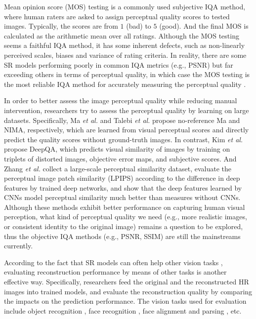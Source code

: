 \label{sec_iqa_mos}
Mean opinion score (MOS) testing is a commonly used subjective IQA method, where human raters are asked to assign perceptual quality scores to tested images.
Typically, the scores are from $1$ (bad) to $5$ (good).
And the final MOS is calculated as the arithmetic mean over all ratings.
Although the MOS testing seems a faithful IQA method, it has some inherent defects, such as non-linearly perceived scales, biases and variance of rating criteria.
In reality, there are some SR models performing poorly in common IQA metrics (e.g., PSNR) but far exceeding others in terms of perceptual quality, in which case the MOS testing is the most reliable IQA method for accurately measuring the perceptual quality .

\label{sec_iqa_learning_perceptual}
In order to better assess the image perceptual quality while reducing manual intervention, researchers try to assess the perceptual quality by learning on large datasets.
Specifically, Ma \textit{et al.}  and Talebi \textit{et al.}  propose no-reference Ma and NIMA, respectively, which are learned from visual perceptual scores and directly predict the quality scores without ground-truth images.
In contrast, Kim \textit{et al.}  propose DeepQA, which predicts visual similarity of images by training on triplets of distorted images, objective error maps, and subjective scores.
And Zhang \textit{et al.}  collect a large-scale perceptual similarity dataset, evaluate the perceptual image patch similarity (LPIPS) according to the difference in deep features by trained deep networks, and show that the deep features learned by CNNs model perceptual similarity much better than measures without CNNs.
Although these methods exhibit better performance on capturing human visual perception, what kind of perceptual quality we need (e.g., more realistic images, or consistent identity to the original image) remains a question to be explored, thus the objective IQA methods (e.g., PSNR, SSIM) are still the mainstreams currently.

\label{sec_iqa_task}
According to the fact that SR models can often help other vision tasks , evaluating reconstruction performance by means of other tasks is another effective way.  
Specifically, researchers feed the original and the reconstructed HR images into trained models, and evaluate the reconstruction quality by comparing the impacts on the prediction performance.
The vision tasks used for evaluation include object recognition , face recognition , face alignment and parsing , etc.

